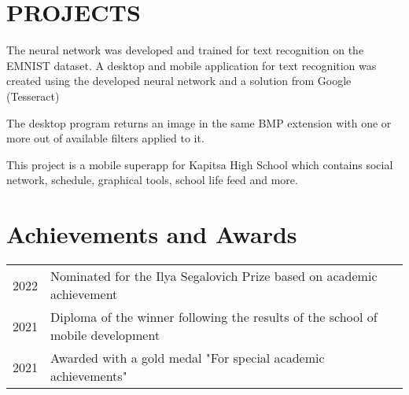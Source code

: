 \documentclass[]{resume}
\begin{document}
\begin{minipage}[t]{0.66\textwidth}
\section{PROJECTS}

The neural network was developed and trained for text recognition on the EMNIST dataset. A desktop and mobile application for text recognition was created using the developed neural network and a solution from Google (Tesseract)

\sectionsep

The desktop program returns an image in the same BMP extension with one or more out of available filters applied to it. 

\sectionsep

This project is a mobile superapp for Kapitsa High School which contains social network, schedule, graphical tools, school life feed and more.

\sectionsep


\section{Achievements and Awards} 
\begin{tabular}{rll}
2022     & Nominated for the Ilya Segalovich Prize based on academic achievement \\
2021     & Diploma of the winner following the results of the school of mobile development\\ 
2021     & Awarded with a gold medal "For special academic achievements" \\

\end{tabular}
\sectionsep\textbf{}


\end{minipage} 
\end{document}

